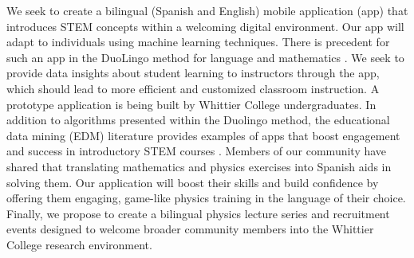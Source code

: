 \documentclass[../../main.tex]{subfiles}
\begin{document}
We seek to create a bilingual (Spanish and English) mobile application (app) that introduces STEM concepts within a welcoming digital environment.  Our app will adapt to individuals using machine learning techniques.  There is precedent for such an app in the DuoLingo method for language and mathematics \cite{duolingo_whitepaper}. We seek to provide data insights about student learning to instructors through the app, which should lead to more efficient and customized classroom instruction.  A prototype application is being built by Whittier College undergraduates.  In addition to algorithms presented within the Duolingo method, the educational data mining (EDM) literature provides examples of apps that boost engagement and success in introductory STEM courses \cite{edm1,edm2,edm3,edm4}.  Members of our community have shared that translating mathematics and physics exercises into Spanish aids in solving them.  Our application will boost their skills and build confidence by offering them engaging, game-like physics training in the language of their choice.  Finally, we propose to create a bilingual physics lecture series and recruitment events designed to welcome broader community members into the Whittier College research environment.

\clearpage
\end{document}

